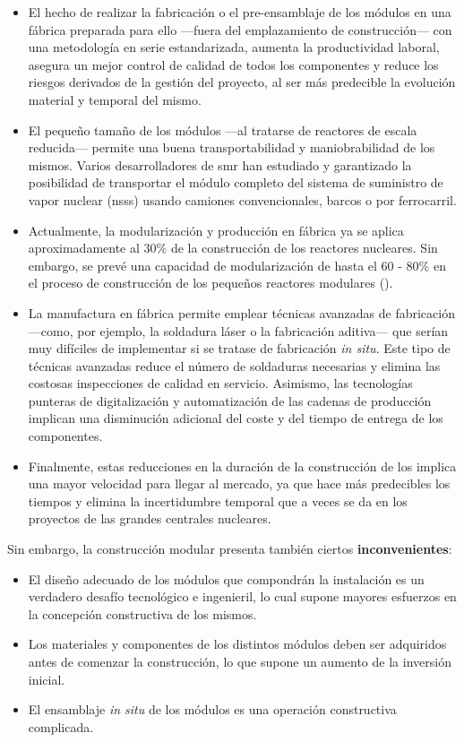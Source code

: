 \begin{itemize}
  \item El hecho de realizar la fabricación o el pre-ensamblaje de los módulos en una fábrica preparada para ello ---fuera del emplazamiento de construcción--- con una metodología en serie estandarizada, aumenta la productividad laboral, asegura un mejor control de calidad de todos los componentes y reduce los riesgos derivados de la gestión del proyecto, al ser más predecible la evolución material y temporal del mismo.
  \item El pequeño tamaño de los módulos ---al tratarse de reactores de escala reducida--- permite una buena transportabilidad y maniobrabilidad de los mismos. Varios desarrolladores de \acrshort{smr} han estudiado y garantizado la posibilidad de transportar el módulo completo del sistema de suministro de vapor nuclear (\acrshort{nsss}) usando camiones convencionales, barcos o por ferrocarril.
  \item Actualmente, la modularización y producción en fábrica ya se aplica aproximadamente al 30\% de la construcción de los reactores nucleares. Sin embargo, se prevé una capacidad de modularización de hasta el 60 - 80\% en el proceso de construcción de los pequeños reactores modulares (\cite{nea_unlocking_2020}).
  \item La manufactura en fábrica permite emplear técnicas avanzadas de fabricación ---como, por ejemplo, la soldadura láser o la fabricación aditiva--- que serían muy difíciles de implementar si se tratase de fabricación \emph{in situ}. Este tipo de técnicas avanzadas reduce el número de soldaduras necesarias y elimina las costosas inspecciones de calidad en servicio. Asimismo, las tecnologías punteras de digitalización y automatización de las cadenas de producción implican una disminución adicional del coste y del tiempo de entrega de los componentes.
  \item Finalmente, estas reducciones en la duración de la construcción de los  implica una mayor velocidad para llegar al mercado, ya que hace más predecibles los tiempos y elimina la incertidumbre temporal que a veces se da en los proyectos de las grandes centrales nucleares.
\end{itemize}

Sin embargo, la construcción modular presenta también ciertos \textbf{inconvenientes}:

\begin{itemize}
  \item El diseño adecuado de los módulos que compondrán la instalación es un verdadero desafío tecnológico e ingenieril, lo cual supone mayores esfuerzos en la concepción constructiva de los mismos.
  \item Los materiales y componentes de los distintos módulos deben ser adquiridos antes de comenzar la construcción, lo que supone un aumento de la inversión inicial.
  \item El ensamblaje \textit{in situ} de los módulos es una operación constructiva complicada.
\end{itemize}

